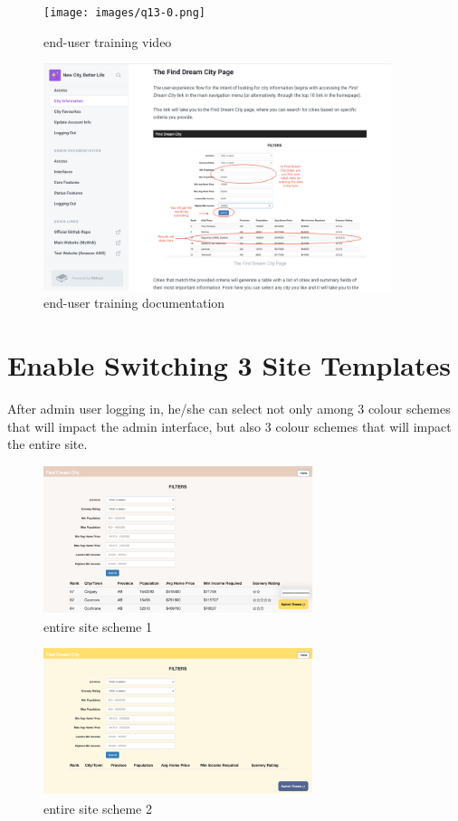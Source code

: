 \documentclass[12pt, letterpaper]{article}
\begin{document}
 \begin{figure}[htbp]
	\centering
	\texttt{[image: images/q13-0.png]}
	\caption{end-user training video}
 \end{figure}
 
 \begin{figure}[htbp]
	\centering
	\includegraphics[width=4in]{images/q13-2.png}
	\caption{end-user training documentation}
 \end{figure}
 
 \newpage

\section{Enable Switching 3 Site Templates}
After admin user logging in, he/she can select not only among 3 colour schemes that will impact the admin interface, but also 3 colour schemes that will impact the entire site. 

\begin{figure}[htbp]
	\centering
	\includegraphics[width=3.1in]{images/q14-1.png}
	\caption{entire site scheme 1}
 \end{figure}
 
 \begin{figure}[htbp]
	\centering
	\includegraphics[width=3.1in]{images/q14-2png.png}
	\caption{entire site scheme 2}
 \end{figure}
\end{document}
